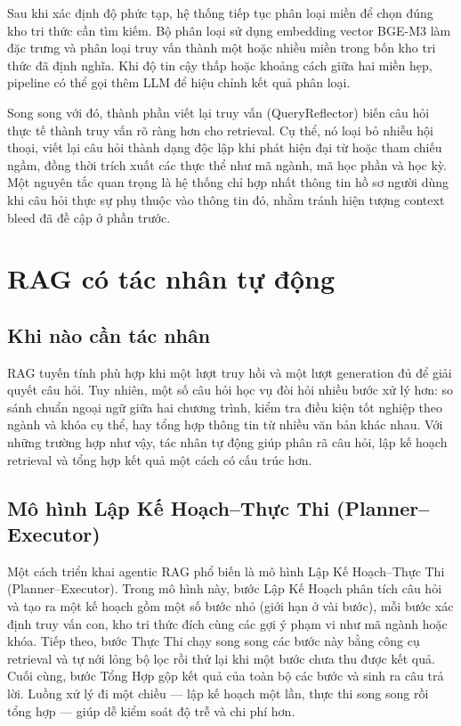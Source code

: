 \documentclass[../DoAn.tex]{subfiles}
\begin{document}
Sau khi xác định độ phức tạp, hệ thống tiếp tục phân loại miền để chọn đúng
kho tri thức cần tìm kiếm. Bộ phân loại sử dụng embedding vector BGE-M3 làm
đặc trưng và phân loại truy vấn thành một hoặc nhiều miền trong bốn kho tri
thức đã định nghĩa. Khi độ tin cậy thấp hoặc khoảng cách giữa hai miền hẹp,
pipeline có thể gọi thêm LLM để hiệu chỉnh kết quả phân loại.

Song song với đó, thành phần viết lại truy vấn (QueryReflector) biến câu hỏi
thực tế thành truy vấn rõ ràng hơn cho retrieval. Cụ thể, nó loại bỏ nhiễu
hội thoại, viết lại câu hỏi thành dạng độc lập khi phát hiện đại từ hoặc tham
chiếu ngầm, đồng thời trích xuất các thực thể như mã ngành, mã học phần và học
kỳ. Một nguyên tắc quan trọng là hệ thống chỉ hợp nhất thông tin hồ sơ người
dùng khi câu hỏi thực sự phụ thuộc vào thông tin đó, nhằm tránh hiện tượng
context bleed đã đề cập ở phần trước.

\section{RAG có tác nhân tự động}

\subsection{Khi nào cần tác nhân}

RAG tuyến tính phù hợp khi một lượt truy hồi và một lượt generation đủ để giải
quyết câu hỏi. Tuy nhiên, một số câu hỏi học vụ đòi hỏi nhiều bước xử lý hơn:
so sánh chuẩn ngoại ngữ giữa hai chương trình, kiểm tra điều kiện tốt nghiệp
theo ngành và khóa cụ thể, hay tổng hợp thông tin từ nhiều văn bản khác nhau.
Với những trường hợp như vậy, tác nhân tự động giúp phân rã câu hỏi, lập kế
hoạch retrieval và tổng hợp kết quả một cách có cấu trúc hơn.

\subsection{Mô hình Lập Kế Hoạch--Thực Thi (Planner--Executor)}

Một cách triển khai agentic RAG phổ biến là mô hình Lập Kế Hoạch--Thực Thi
(Planner--Executor). Trong mô hình này, bước Lập Kế Hoạch phân tích câu hỏi và
tạo ra một kế hoạch gồm một số bước nhỏ (giới hạn ở vài bước), mỗi bước xác định
truy vấn con, kho tri thức đích cùng các gợi ý phạm vi như mã ngành hoặc khóa.
Tiếp theo, bước Thực Thi chạy song song các bước này bằng công cụ retrieval và
tự nới lỏng bộ lọc rồi thử lại khi một bước chưa thu được kết quả. Cuối cùng,
bước Tổng Hợp gộp kết quả của toàn bộ các bước và sinh ra câu trả lời. Luồng xử
lý đi một chiều --- lập kế hoạch một lần, thực thi song song rồi tổng hợp --- giúp dễ
kiểm soát độ trễ và chi phí hơn.
\end{document}
